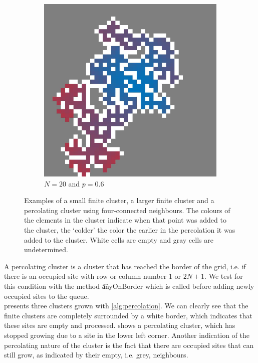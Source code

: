 \begin{figure}[t!]
	\begin{subfigure}{0.50\columnwidth}
		\centering
		\includegraphics[width=\textwidth]{./img/fancy_cluster_N20_p6_rng_5}
		\caption{$N = 20$ and $p = 0.6$}
		\label{fig:method:fin_inf:infinite}
	\end{subfigure}	
	\caption{Examples of  a small finite cluster,  a larger finite cluster and  a percolating cluster using four-connected neighbours. The colours of the elements in the cluster indicate when that point was added to the cluster, the `colder' the color the earlier in the percolation it was added to the cluster. White cells are empty and gray cells are undetermined. }
	\label{fig:method:fin_inf}
\end{figure}


A percolating cluster is a cluster that has reached the border of the grid, i.e. if there is an occupied site with row or column number $1$ or $2N + 1$. We test for this condition with the method \t{anyOnBorder} which is called before adding newly occupied sites to the queue.\\

 presents three clusters grown with \cref{alg:percolation}. We can clearly see that the finite clusters are completely surrounded by a white border, which indicates that these sites are empty and processed.  shows a percolating cluster, which has stopped growing due to a site in the lower left corner.
Another indication of the percolating nature of the cluster is the fact that there are occupied sites that can still grow, as indicated by their empty, i.e. grey, neighbours.

